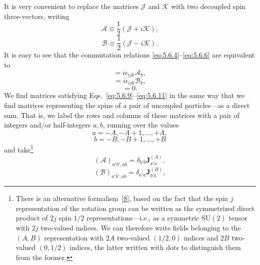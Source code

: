 It is very convenient to replace the matrices $\mathcal{J}$ and $\mathcal{K}$
with two decoupled spin three-vectors, writing
\begin{equation}
\mathcal{A}\equiv\frac12(\mathcal{J}+i\mathcal{K}),
\tag{5.6.7}\label{eq:5.6.7}
\end{equation}
\begin{equation}
\mathcal{B}\equiv\frac12(\mathcal{J}-i\mathcal{K}).
\tag{5.6.8}\label{eq:5.6.8}
\end{equation}
It is easy to see that the commutation relations \eqref{eq:5.6.4}--\eqref{eq:5.6.6} are
equivalent to
\begin{equation}
[\mathcal{A}_i,\mathcal{A}_j]=i\epsilon_{ijk}\mathcal{A}_k,
\tag{5.6.9}\label{eq:5.6.9}
\end{equation}
\begin{equation}
[\mathcal{B}_i,\mathcal{B}_j]=i\epsilon_{ijk}\mathcal{B}_k,
\tag{5.6.10}\label{eq:5.6.10}
\end{equation}
\begin{equation}
[\mathcal{A}_i,\mathcal{B}_j]=0.
\tag{5.6.11}\label{eq:5.6.11}
\end{equation}
We find matrices satisfying Eqs.~\eqref{eq:5.6.9}--\eqref{eq:5.6.11} in the same way that we
find matrices representing the spins of a pair of uncoupled particles---as a
direct sum. That is, we label the rows and columns of these matrices with a
pair of integers and/or half-integers $a,b$, running over the values
\begin{equation}
a=-A,-A+1,\ldots,+A,
\tag{5.6.12}\label{eq:5.6.12}
\end{equation}
\begin{equation}
b=-B,-B+1,\ldots,+B
\tag{5.6.13}\label{eq:5.6.13}
\end{equation}
and take\footnote{There is an alternative formalism~\hyperref[ref:5.8]{[8]}, based on the fact that
the spin $j$ representation of the rotation group can be written as the
symmetrized direct product of $2j$ spin $1/2$ representations---i.e., as a
symmetric $\mathrm{SU}(2)$ tensor with $2j$ two-valued indices. We can
therefore write fields belonging to the $(A,B)$ representation with $2A$
two-valued $(1/2,0)$ indices and $2B$ two-valued $(0,1/2)$ indices, the latter
written with dots to distinguish them from the former.}
\begin{equation}
(\mathcal{A})_{a'b',ab}=\delta_{b'b}\mathbf J^{(A)}_{a'a},
\tag{5.6.14}\label{eq:5.6.14}
\end{equation}
\begin{equation}
(\mathcal{B})_{a'b',ab}=\delta_{a'a}\mathbf J^{(B)}_{b'b},
\tag{5.6.15}\label{eq:5.6.15}
\end{equation}
